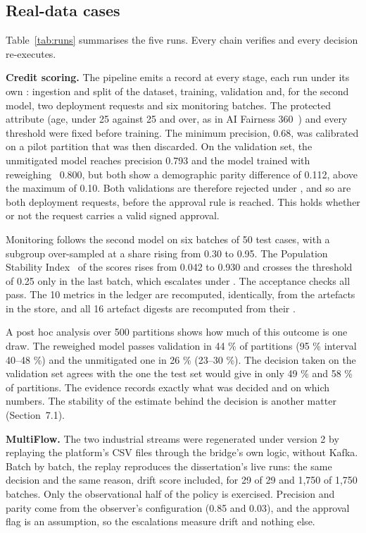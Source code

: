 \subsection{Real-data cases}

Table~\ref{tab:runs} summarises the five runs. Every chain verifies and every decision re-executes.



\textbf{Credit scoring.} The pipeline emits a record at every stage, each run under its own : ingestion and split of the dataset, training, validation and, for the second model, two deployment requests and six monitoring batches. The protected attribute (age, under 25 against 25 and over, as in AI Fairness 360~\cite{bellamy2019}) and every threshold were fixed before training. The minimum precision, 0.68, was calibrated on a pilot partition that was then discarded. On the validation set, the unmitigated model reaches precision 0.793 and the model trained with reweighing~\cite{kamiran2012} 0.800, but both show a demographic parity difference of 0.112, above the maximum of 0.10. Both validations are therefore rejected under , and so are both deployment requests, before the approval rule is reached. This holds whether or not the request carries a valid signed approval.

Monitoring follows the second model on six batches of 50 test cases, with a subgroup over-sampled at a share rising from 0.30 to 0.95. The Population Stability Index~\cite{siddiqi2006} of the scores rises from 0.042 to 0.930 and crosses the threshold of 0.25 only in the last batch, which escalates under . The acceptance checks all pass. The 10 metrics in the ledger are recomputed, identically, from the artefacts in the store, and all 16 artefact digests are recomputed from their .

A post hoc analysis over 500 partitions shows how much of this outcome is one draw. The reweighed model passes validation in 44 \% of partitions (95 \% interval 40--48 \%) and the unmitigated one in 26 \% (23--30 \%). The decision taken on the validation set agrees with the one the test set would give in only 49 \% and 58 \% of partitions. The evidence records exactly what was decided and on which numbers. The stability of the estimate behind the decision is another matter (Section~7.1).

\textbf{MultiFlow.} The two industrial streams were regenerated under version 2 by replaying the platform's CSV files through the bridge's own logic, without Kafka. Batch by batch, the replay reproduces the dissertation's live runs: the same decision and the same reason, drift score included, for 29 of 29 and 1,750 of 1,750 batches. Only the observational half of the policy is exercised. Precision and parity come from the observer's configuration (0.85 and 0.03), and the approval flag is an assumption, so the escalations measure drift and nothing else.

